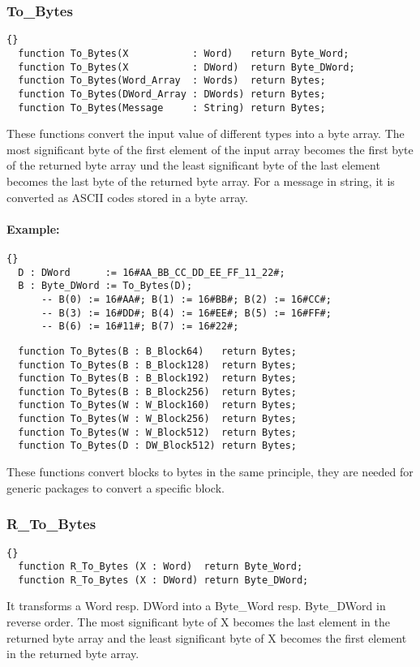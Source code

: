 \hhline
\subsubsection*{To\_Bytes}
\begin{lstlisting}{}
  function To_Bytes(X           : Word)   return Byte_Word;
  function To_Bytes(X           : DWord)  return Byte_DWord;
  function To_Bytes(Word_Array  : Words)  return Bytes;
  function To_Bytes(DWord_Array : DWords) return Bytes;
  function To_Bytes(Message     : String) return Bytes;
\end{lstlisting}
These functions convert the input value of different types into a byte
array. The most significant byte of the first element of the input
array becomes the first byte of the returned byte array und the least
significant byte of the last element becomes the last byte of the
returned byte array. For a message in string, it is converted as ASCII
codes stored in a byte array.

\paragraph{Example:}
\begin{lstlisting}{}
  D : DWord      := 16#AA_BB_CC_DD_EE_FF_11_22#;
  B : Byte_DWord := To_Bytes(D);
      -- B(0) := 16#AA#; B(1) := 16#BB#; B(2) := 16#CC#;
      -- B(3) := 16#DD#; B(4) := 16#EE#; B(5) := 16#FF#;
      -- B(6) := 16#11#; B(7) := 16#22#;
\end{lstlisting}
\begin{lstlisting}
  function To_Bytes(B : B_Block64)   return Bytes;
  function To_Bytes(B : B_Block128)  return Bytes;
  function To_Bytes(B : B_Block192)  return Bytes;
  function To_Bytes(B : B_Block256)  return Bytes;
  function To_Bytes(W : W_Block160)  return Bytes;
  function To_Bytes(W : W_Block256)  return Bytes;
  function To_Bytes(W : W_Block512)  return Bytes;
  function To_Bytes(D : DW_Block512) return Bytes;
\end{lstlisting}
These functions convert blocks to bytes in the same principle, they
are needed for generic packages to convert a specific block.

\hhline

\subsubsection*{R\_To\_Bytes}
\begin{lstlisting}{}
  function R_To_Bytes (X : Word)  return Byte_Word;
  function R_To_Bytes (X : DWord) return Byte_DWord;
\end{lstlisting}
It transforms a Word resp. DWord into a Byte\_Word resp. Byte\_DWord
in reverse order. The most significant byte of X becomes the last
element in the returned byte array and the least significant byte of X
becomes the first element in the returned byte array.

